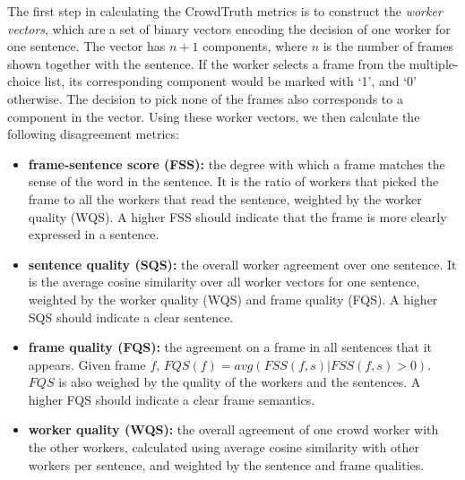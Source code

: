 The first step in calculating the CrowdTruth metrics is to construct the \textit{worker vectors}, which are a set of binary vectors encoding the decision of one worker for one sentence. The vector has $n+1$ components, where $n$ is the number of frames shown together with the sentence. If the worker selects a frame from the multiple-choice list, its corresponding component would be marked with `1', and `0' otherwise. The decision to pick none of the frames also corresponds to a component in the vector. Using these worker vectors, we then calculate the following disagreement metrics:

\begin{itemize}
\item \textbf{frame-sentence score (FSS):} the degree with which a frame matches the sense of the word in the sentence. It is the ratio of workers that picked the frame to all the workers that read the sentence, weighted by the worker quality (WQS).  A higher FSS should indicate that the frame is more clearly expressed in a sentence.

\item \textbf{sentence quality (SQS):} the overall worker agreement over one sentence. It is the average cosine similarity over all worker vectors for one sentence, weighted by the worker quality (WQS) and frame quality (FQS). A higher SQS should indicate a clear sentence.

\item \textbf{frame quality (FQS):} the agreement on a frame in all sentences that it appears. Given frame $f$, $ FQS(f) = avg(FSS(f,s) | FSS(f,s) > 0)$. $FQS$ is also weighed by the quality of the workers and the sentences.  A higher FQS should indicate a clear frame semantics.

\item \textbf{worker quality (WQS):} the overall agreement of one crowd worker with the other workers, calculated using average cosine similarity with other workers per sentence, and weighted by the sentence and frame qualities.

\end{itemize}

